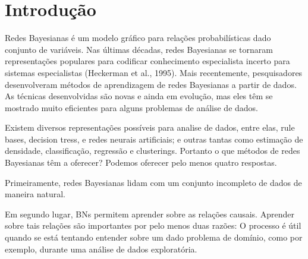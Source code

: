 \chapter{Introdução}%
Redes Bayesianas é um modelo gráfico para relações probabilísticas dado conjunto de variáveis. Nas últimas décadas, redes Bayesianas se tornaram representações populares para codificar conhecimento especialista incerto para sistemas especialistas (Heckerman et al., 1995). Mais recentemente, pesquisadores desenvolveram métodos de aprendizagem de redes Bayesianas a partir de dados. As técnicas desenvolvidas são novas e ainda em evolução, mas eles têm se mostrado muito eficientes para alguns problemas de análise de dados.

Existem diversos representações possíveis para analise de dados, entre elas, rule bases, decision tress, e redes neurais artificiais; e outras tantas como estimação de densidade, classificação, regressão e clusterings. Portanto o que métodos de redes Bayesianas têm a oferecer? Podemos oferecer pelo menos quatro respostas.

Primeiramente, redes Bayesianas lidam com um conjunto incompleto de dados de maneira natural.

Em segundo lugar, BNs permitem aprender sobre as relações causais. Aprender sobre tais relações são importantes por pelo menos duas razões: O processo é útil quando se está tentando entender sobre um dado problema de domínio, como por exemplo, durante uma análise de dados exploratória. 